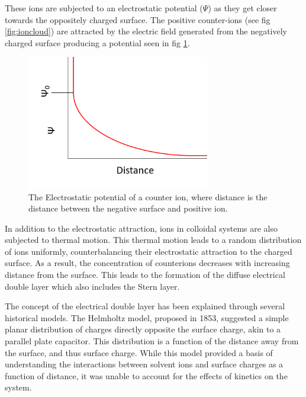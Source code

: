 These ions are subjected to an electrostatic potential ($\Psi$) as they get closer towards the oppositely charged surface. The positive counter-ions (see fig \ref{fig:ioncloud}) are attracted by the electric field generated from the negatively charged surface producing a potential seen in fig \ref{fig:psi}. 

\begin{figure}[h]    
        \begin{center}
          \includegraphics[width=80mm]{chapter1/psi.PNG}
\end{center}
\caption{The Electrostatic potential of a counter ion, where distance is the distance between the negative surface and positive ion.}
\label{fig:psi}                
\end{figure}


In addition to the electrostatic attraction, ions in colloidal systems are also subjected to thermal motion. This thermal motion leads to a random distribution of ions uniformly, counterbalancing their electrostatic attraction to the charged surface. As a result, the concentration of counterions decreases with increasing distance from the surface. This leads to the formation of the diffuse electrical double layer which also includes the Stern layer. 

The concept of the electrical double layer has been explained through several historical models. The Helmholtz model, proposed in 1853, suggested a simple planar distribution of charges directly opposite the surface charge, akin to a parallel plate capacitor. This distribution is a function of the distance away from the surface, and thus surface charge. While this model provided a basis of understanding the interactions between solvent ions and surface charges as a function of distance, it was unable to account for the effects of kinetics on the system.

